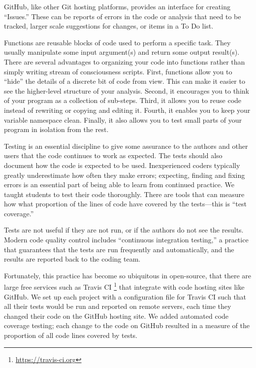 GitHub, like other Git hosting platforms, provides an interface for creating
``Issues.''  These can be reports of errors in the code or analysis that need
to be tracked, larger scale suggestions for changes, or items in a To Do list.

Functions are reusable blocks of code used to perform a specific task.
They usually manipulate some input argument(s) and return some output
result(s).
There are several advantages to organizing your code into functions rather
than simply writing stream of consciousness scripts.
First, functions allow you to ``hide'' the details of a discrete bit of
code from view.
This can make it easier to see the higher-level structure of your analysis.
Second, it encourages you to think of your program as a collection of sub-steps.
Third, it allows you to reuse code instead of rewriting or copying and editing
it.
Fourth, it enables you to keep your variable namespace clean.
Finally, it also allows you to test small parts of your program in isolation
from the rest.

Testing is an essential discipline to give some assurance to the authors and
other users that the code
continues to work as expected. The tests should also document how the code is
expected to be used.
Inexperienced coders typically greatly underestimate how often they make
errors; expecting, finding and fixing errors is an essential part of being
able to learn from continued practice.  We taught students to test their code
thoroughly.  There are tools that can measure how what proportion of the lines
of code have covered by the tests---this is ``test coverage.''


Tests are not useful if they are not run, or if the authors do not see the
results.  Modern code quality control includes ``continuous integration
testing,'' a practice that guarantees that the tests are run frequently and
automatically, and the results are reported back to the coding team.

Fortunately, this practice has become so ubiquitous in open-source, that there
are large free services such as Travis CI
\footnote{\url{https://travis-ci.org}} that integrate with code hosting sites
like GitHub. We set up each project with a configuration file for Travis CI
such that all their tests would be run and reported on remote servers, each
time they changed their code on the GitHub hosting site.  We added automated
code coverage testing; each change to the code on GitHub resulted in a measure
of the proportion of all code lines covered by tests.

